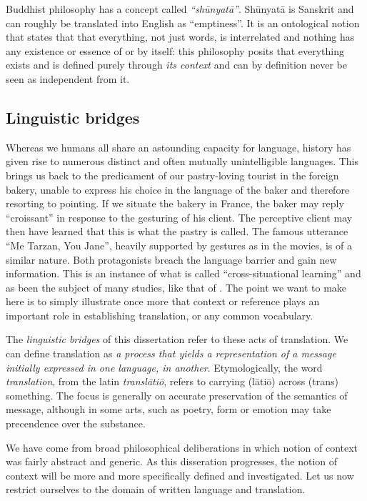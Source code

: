 Buddhist philosophy has a concept called \emph{``sh\=unyat\=a''}. Sh\=unyat\=a is Sanskrit and can
roughly be translated into English as ``emptiness''. It is an ontological
notion that states that that everything, not just words, is interrelated and nothing has any
existence or essence of or by itself: this philosophy posits that everything
exists and is defined purely through \emph{its context} and can by definition
never be seen as independent from it.

\subsection*{Linguistic bridges}
\label{sec:bridges}

Whereas we humans all share an astounding capacity for language, history has given rise to numerous distinct and often
mutually unintelligible languages.  This brings us back to the predicament of our pastry-loving tourist in the foreign
bakery, unable to express his choice in the language of the baker and therefore resorting to pointing. If we situate the
bakery in France, the baker may reply ``croissant'' in response to the gesturing of his client. The perceptive client
may then have learned that this is what the pastry is called.  The famous utterance ``Me Tarzan, You Jane'', heavily
supported by gestures as in the movies, is of a similar nature. Both protagonists breach the language barrier and gain
new information. This is an instance of what is called ``cross-situational learning'' and as been the subject of many
studies, like that of \cite{PINKER89}. The point we want to make here is to simply illustrate once more that context or
reference plays an important role in establishing translation, or any common vocabulary.


The \emph{linguistic bridges} of this dissertation refer to these acts of
translation. We can define translation as \emph{a process that yields a
representation of a message initially expressed in one language, in another}.
Etymologically, the word \emph{translation}, from the latin \emph{transl\=ati\=o},
refers to carrying (l\=ati\=o) across (trans) something. The focus is generally on
accurate preservation of the semantics of message, although in some arts, such
as poetry, form or emotion may take precendence over the substance.

We have come from broad philosophical deliberations in which notion of context was fairly abstract and
generic. As this disseration progresses, the notion of context will be more and more specifically defined and investigated.
Let us now restrict ourselves to the domain of written language and translation.

